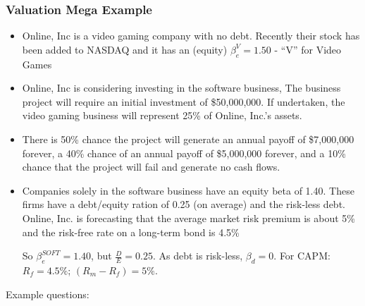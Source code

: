 \documentclass{scrartcl}
\begin{document}
\subsubsection{Valuation Mega Example}
\label{sec:MegaExample}

\begin{itemize}
\item Online, Inc is a video gaming company with no debt. Recently their stock
  has been added to NASDAQ and it has an (equity) $\beta_e^V = 1.50$ - ``V''
  for Video Games
\item Online, Inc is considering investing in the software business, The
  business project will require an initial investment of \$50,000,000. If
  undertaken, the video gaming business will represent 25\% of Online, Inc.'s
  assets. 
\item  There is 50\% chance the project will generate an annual payoff of
  \$7,000,000 forever, a 40\% chance of an annual payoff of \$5,000,000 forever,
  and a 10\% chance that the project will fail and generate no cash flows.
\item Companies solely in the software business have an equity beta of 1.40.
  These firms have a debt/equity ration of 0.25 (on average) and the risk-less
  debt. Online, Inc. is forecasting that the average market risk premium is
  about 5\% and the risk-free rate on a long-term bond is 4.5\%

So $\beta_e^{SOFT} = 1.40$, but $\frac{D}E = 0.25$. As debt is risk-less,
$\beta_d = 0$. For CAPM: $R_f = 4.5\%$; $(R_m - R_f) = 5\%$.
\end{itemize}
Example questions:
\end{document}

